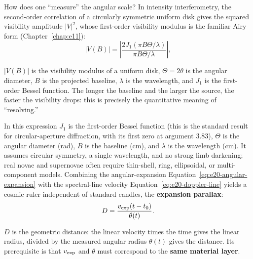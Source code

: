 How does one ``measure'' the angular scale? In intensity interferometry, the second-order correlation of a circularly symmetric uniform disk gives the squared visibility amplitude \(|V|^2\), whose first-order visibility modulus is the familiar Airy form (Chapter~\ref{chap:e11}):
\begin{equation}
  |V(B)|=
  \left|
  \frac{2J_1(\pi B\Theta/\lambda)}{\pi B\Theta/\lambda}
  \right|,
  \label{eq:e20-uniform-disk-visibility}
\end{equation}
\begin{formulaexplain}
\(|V(B)|\) is the visibility modulus of a uniform disk, \(\Theta=2\theta\) is the angular diameter, \(B\) is the projected baseline, \(\lambda\) is the wavelength, and \(J_1\) is the first-order Bessel function. The longer the baseline and the larger the source, the faster the visibility drops: this is precisely the quantitative meaning of ``resolving.''
\end{formulaexplain}
In this expression \(J_1\) is the first-order Bessel function (this is the standard result for circular-aperture diffraction, with its first zero at argument \(3.83\)), \(\Theta\) is the angular diameter (rad), \(B\) is the baseline (cm), and \(\lambda\) is the wavelength (cm). It assumes circular symmetry, a single wavelength, and no strong limb darkening; real novae and supernovae often require thin-shell, ring, ellipsoidal, or multi-component models. Combining the angular-expansion Equation~\eqref{eq:e20-angular-expansion} with the spectral-line velocity Equation~\eqref{eq:e20-doppler-line} yields a cosmic ruler independent of standard candles, the \textbf{expansion parallax}:
\begin{equation}
  D=\frac{v_{\rm exp}(t-t_0)}{\theta(t)}.
  \label{eq:e20-expansion-parallax}
\end{equation}
\begin{formulaexplain}
\(D\) is the geometric distance: the linear velocity times the time gives the linear radius, divided by the measured angular radius \(\theta(t)\) gives the distance. Its prerequisite is that \(v_{\rm exp}\) and \(\theta\) must correspond to the \textbf{same material layer}.
\end{formulaexplain}
